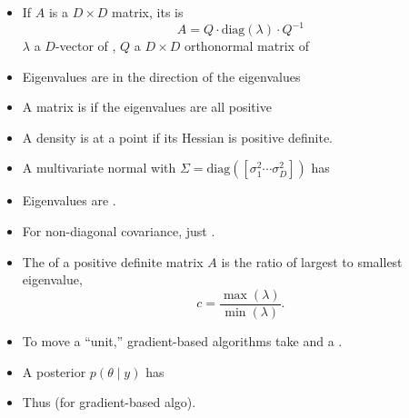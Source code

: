 \documentclass[10pt]{report}
\begin{document}
\begin{itemize}
\item If $A$ is a $D \times D$ matrix, its  is
  $$
  A = Q \cdot \textrm{diag}(\lambda) \cdot Q^{-1}
  $$
  $\lambda$ a $D$-vector of , $Q$ a
  $D \times D$ orthonormal matrix of 
\item Eigenvalues are  in the direction of the eigenvalues
\end{itemize}

\begin{itemize}
\item A matrix is  if the eigenvalues are
  all positive
\item A density is  at a point if its Hessian is positive definite. 
\item A multivariate normal with  $\Sigma =
  \textrm{diag}([\sigma_1^2 \cdots \sigma_D^2])$ has
\item Eigenvalues are .
\item For non-diagonal covariance, just .
\end{itemize}

\begin{itemize}
\item The  of a positive definite matrix $A$ is the 
  ratio of largest to smallest eigenvalue,
  $$c = \frac{\max(\lambda)}{\min(\lambda)}.$$
\item To move a ``unit,'' gradient-based algorithms take  and a .
\item A posterior $p(\theta \mid y)$ has
\item Thus  (for
  gradient-based algo).
\end{itemize}
\end{document}
